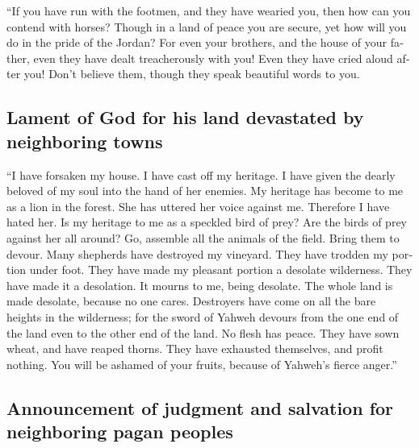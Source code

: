 \begin{paracol}{2}
\begin{otherlanguage}{english}
 ``If you have run with the footmen, and they have wearied
you, then how can you contend with horses? Though in a land of peace you
are secure, yet how will you do in the pride of the Jordan?
 For even your brothers, and the house of your father,
even they have dealt treacherously with you! Even they have cried aloud
after you! Don't believe them, though they speak beautiful words to you.

\hypertarget{lament-of-god-for-his-land-devastated-by-neighboring-towns}{%
\subsection{Lament of God for his land devastated by neighboring
towns}\label{lament-of-god-for-his-land-devastated-by-neighboring-towns}}

 ``I have forsaken my house. I have cast off my heritage.
I have given the dearly beloved of my soul into the hand of her enemies.
 My heritage has become to me as a lion in the forest. She
has uttered her voice against me. Therefore I have hated her.
 Is my heritage to me as a speckled bird of prey? Are the
birds of prey against her all around? Go, assemble all the animals of
the field. Bring them to devour.  Many shepherds have
destroyed my vineyard. They have trodden my portion under foot. They
have made my pleasant portion a desolate wilderness. 
They have made it a desolation. It mourns to me, being desolate. The
whole land is made desolate, because no one cares. 
Destroyers have come on all the bare heights in the wilderness; for the
sword of Yahweh devours from the one end of the land even to the other
end of the land. No flesh has peace.  They have sown
wheat, and have reaped thorns. They have exhausted themselves, and
profit nothing. You will be ashamed of your fruits, because of Yahweh's
fierce anger.''

\hypertarget{announcement-of-judgment-and-salvation-for-neighboring-pagan-peoples}{%
\subsection{Announcement of judgment and salvation for neighboring pagan
peoples}\label{announcement-of-judgment-and-salvation-for-neighboring-pagan-peoples}}


\end{otherlanguage}
\end{paracol}
